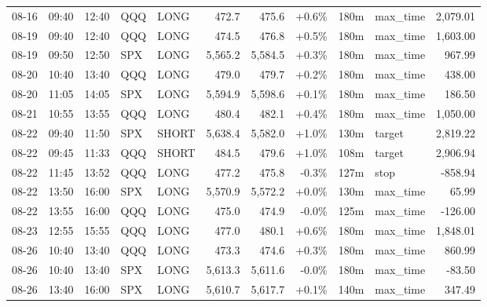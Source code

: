 \documentclass[11pt,a4paper,twoside]{article}
\begin{document}
\begin{center}
\begin{longtable}{>{\color{txtmain}}l l l l l r r r r >{\color{txtmain}}l r}
08-16 & 09:40 & 12:40 & QQQ & LONG & 472.7 & 475.6 & \textcolor{wingreen}{+0.6\%} & 180m & max\_time & \textcolor{wingreen}{2,079.01} \\
08-19 & 09:40 & 12:40 & QQQ & LONG & 474.5 & 476.8 & \textcolor{wingreen}{+0.5\%} & 180m & max\_time & \textcolor{wingreen}{1,603.00} \\
08-19 & 09:50 & 12:50 & SPX & LONG & 5,565.2 & 5,584.5 & \textcolor{wingreen}{+0.3\%} & 180m & max\_time & \textcolor{wingreen}{967.99} \\
08-20 & 10:40 & 13:40 & QQQ & LONG & 479.0 & 479.7 & \textcolor{wingreen}{+0.2\%} & 180m & max\_time & \textcolor{wingreen}{438.00} \\
08-20 & 11:05 & 14:05 & SPX & LONG & 5,594.9 & 5,598.6 & \textcolor{wingreen}{+0.1\%} & 180m & max\_time & \textcolor{wingreen}{186.50} \\
08-21 & 10:55 & 13:55 & QQQ & LONG & 480.4 & 482.1 & \textcolor{wingreen}{+0.4\%} & 180m & max\_time & \textcolor{wingreen}{1,050.00} \\
08-22 & 09:40 & 11:50 & SPX & SHORT & 5,638.4 & 5,582.0 & \textcolor{wingreen}{+1.0\%} & 130m & target & \textcolor{wingreen}{2,819.22} \\
08-22 & 09:45 & 11:33 & QQQ & SHORT & 484.5 & 479.6 & \textcolor{wingreen}{+1.0\%} & 108m & target & \textcolor{wingreen}{2,906.94} \\
08-22 & 11:45 & 13:52 & QQQ & LONG & 477.2 & 475.8 & \textcolor{lossred}{-0.3\%} & 127m & stop & \textcolor{lossred}{-858.94} \\
08-22 & 13:50 & 16:00 & SPX & LONG & 5,570.9 & 5,572.2 & \textcolor{wingreen}{+0.0\%} & 130m & max\_time & \textcolor{wingreen}{65.99} \\
08-22 & 13:55 & 16:00 & QQQ & LONG & 475.0 & 474.9 & \textcolor{lossred}{-0.0\%} & 125m & max\_time & \textcolor{lossred}{-126.00} \\
08-23 & 12:55 & 15:55 & QQQ & LONG & 477.0 & 480.1 & \textcolor{wingreen}{+0.6\%} & 180m & max\_time & \textcolor{wingreen}{1,848.01} \\
08-26 & 10:40 & 13:40 & QQQ & LONG & 473.3 & 474.6 & \textcolor{wingreen}{+0.3\%} & 180m & max\_time & \textcolor{wingreen}{860.99} \\
08-26 & 10:40 & 13:40 & SPX & LONG & 5,613.3 & 5,611.6 & \textcolor{lossred}{-0.0\%} & 180m & max\_time & \textcolor{lossred}{-83.50} \\
08-26 & 13:40 & 16:00 & SPX & LONG & 5,610.7 & 5,617.7 & \textcolor{wingreen}{+0.1\%} & 140m & max\_time & \textcolor{wingreen}{347.49} \\

\end{longtable}
\end{center}
\end{document}
